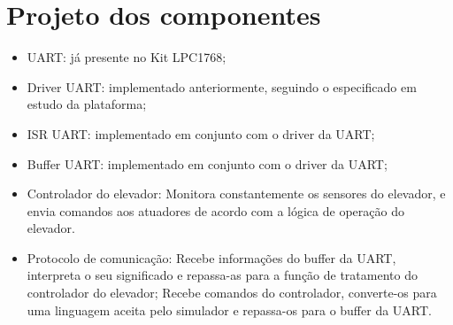 \chapter{Projeto dos componentes}

\begin{itemize}
	\item UART: já presente no Kit LPC1768;
	\item Driver UART: implementado anteriormente, seguindo o especificado em estudo da plataforma;
	\item ISR UART: implementado em conjunto com o driver da UART;
	\item Buffer UART: implementado em conjunto com o driver da UART;
	\item Controlador do elevador: Monitora constantemente os sensores do elevador, e envia comandos aos atuadores de acordo com a lógica de operação do elevador. 
	\item Protocolo de comunicação: Recebe informações do buffer da UART, interpreta o seu significado e repassa-as para a função de tratamento do controlador do elevador; Recebe comandos do controlador, converte-os para uma linguagem aceita pelo simulador e repassa-os para o buffer da UART.
\end{itemize}



